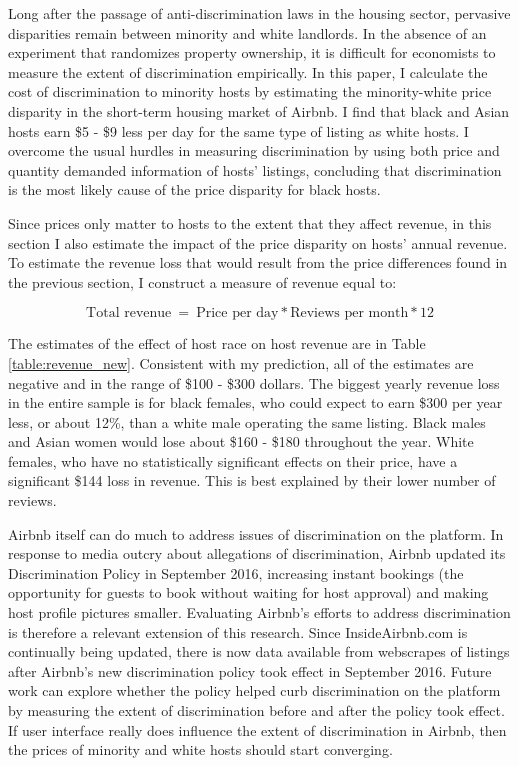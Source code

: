 
Long after the passage of anti-discrimination laws in the housing sector, pervasive disparities remain between minority and white landlords. In the absence of an experiment that randomizes property ownership, it is difficult for economists to measure the extent of discrimination empirically. In this paper, I calculate the cost of discrimination to minority hosts by estimating the minority-white price disparity in the short-term housing market of Airbnb. I find that black and Asian hosts earn \$5 - \$9 less per day for the same type of listing as white hosts. I overcome the usual hurdles in measuring discrimination by using both price and quantity demanded information of hosts' listings, concluding that discrimination is the most likely cause of the price disparity for black hosts. 

Since prices only matter to hosts to the extent that they affect revenue, in this section I also estimate the impact of the price disparity on hosts' annual revenue. To estimate the revenue loss that would result from the price differences found in the previous section, I construct a measure of revenue equal to: 

\[\text{Total revenue} \ = \ \text{Price per day} * \text{Reviews per month}  * 12\] 

The estimates of the effect of host race on host revenue are in Table \ref{table:revenue_new}. Consistent with my prediction, all of the estimates are negative and in the range of \$100 - \$300 dollars. The biggest yearly revenue loss in the entire sample is for black females, who could expect to earn \$300 per year less, or about 12\%, than a white male operating the same listing. Black males and Asian women would lose about \$160 - \$180 throughout the year. White females, who have no statistically significant effects on their price, have a significant \$144 loss in revenue. This is best explained by their lower number of reviews. 

Airbnb itself can do much to address issues of discrimination on the platform. In response to media outcry about allegations of discrimination, Airbnb updated its Discrimination Policy in September 2016, increasing instant bookings (the opportunity for guests to book without waiting for host approval) and making host profile pictures smaller. Evaluating Airbnb's efforts to address discrimination is therefore a relevant extension of this research. Since InsideAirbnb.com is continually being updated, there is now data available from webscrapes of listings after Airbnb's new discrimination policy took effect in September 2016. Future work can explore whether the policy helped curb discrimination on the platform by measuring the extent of discrimination before and after the policy took effect. If user interface really does influence the extent of discrimination in Airbnb, then the prices of minority and white hosts should start converging. 
